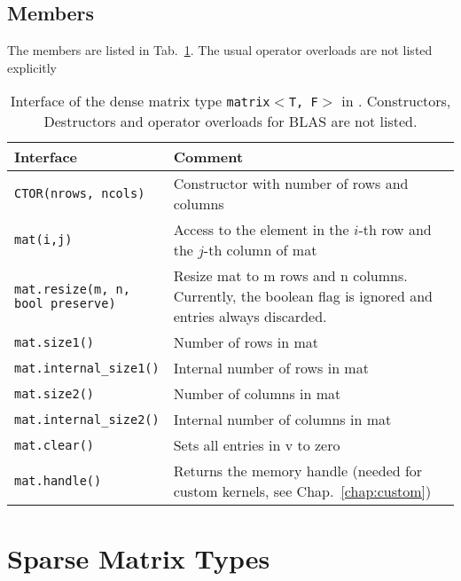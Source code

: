\subsection{Members}

The members are listed in Tab.~\ref{tab:matrix-interface}. The usual operator overloads are not listed explicitly

\begin{table}[tb]
\begin{center}
\begin{tabular}{p{6.5cm}|p{8.5cm}}
Interface & Comment\\
\hline
\texttt{CTOR(nrows, ncols)}    & Constructor with number of rows and columns \\
\texttt{mat(i,j)}    & Access to the element in the $i$-th row and the $j$-th column of mat \\
\parbox{6cm}{\texttt{mat.resize(m, n, \\
           \hphantom{mat.resize(}bool preserve)}}    & Resize mat to m rows and n columns. Currently, the boolean flag is ignored and entries always discarded. \\
\texttt{mat.size1()}            & Number of rows in mat \\
\texttt{mat.internal\_size1()}   & Internal number of rows in mat \\
\texttt{mat.size2()}            & Number of columns in mat \\
\texttt{mat.internal\_size2()}   & Internal number of columns in mat \\
\texttt{mat.clear()}   & Sets all entries in v to zero \\
\texttt{mat.handle()}  & Returns the memory handle (needed for custom kernels, see Chap.~\ref{chap:custom})
\end{tabular}
\caption{Interface of the dense matrix type \texttt{matrix$<$T, F$>$} in
\ViennaCL. Constructors, Destructors and operator overloads for BLAS are not
listed.}
\label{tab:matrix-interface}
\end{center}
\end{table}


\section{Sparse Matrix Types}

